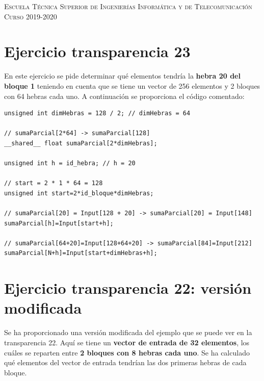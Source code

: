 \documentclass[11pt,a4paper]{article}
\begin{document}
\begin{titlepage}
\begin{minipage}{\textwidth}
\vspace{0.7cm}
\textsc{Escuela Técnica Superior de Ingenierías Informática y de Telecomunicación}\\
\vspace{1cm}
\textsc{Curso 2019-2020}
\end{minipage}
\end{titlepage}

\tableofcontents
\thispagestyle{empty}				%

\newpage

\setlength{\parskip}{1em}

\section{Ejercicio transparencia 23}

En este ejercicio se pide determinar qué elementos tendría la \textbf{hebra 20 del bloque 1}
teniendo en cuenta que se tiene un vector de 256 elementos y 2 bloques con 64 hebras cada
uno. A continuación se proporciona el código comentado:

\begin{lstlisting}
unsigned int dimHebras = 128 / 2; // dimHebras = 64

// sumaParcial[2*64] -> sumaParcial[128]
__shared__ float sumaParcial[2*dimHebras];

unsigned int h = id_hebra; // h = 20

// start = 2 * 1 * 64 = 128
unsigned int start=2*id_bloque*dimHebras;

// sumaParcial[20] = Input[128 + 20] -> sumaParcial[20] = Input[148]
sumaParcial[h]=Input[start+h];

// sumaParcial[64+20]=Input[128+64+20] -> sumaParcial[84]=Input[212]
sumaParcial[N+h]=Input[start+dimHebras+h];
\end{lstlisting}

\section{Ejercicio transparencia 22: versión modificada}

Se ha proporcionado una versión modificada del ejemplo que se puede ver en la
transparencia 22. Aquí se tiene un \textbf{vector de entrada de 32 elementos}, los cuáles
se reparten entre \textbf{2 bloques con 8 hebras cada uno}. Se ha calculado qué elementos
del vector de entrada tendrían las dos primeras hebras de cada bloque.
\end{document}
